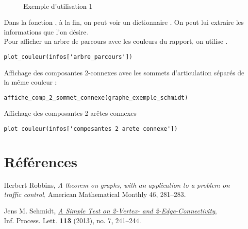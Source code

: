 \documentclass{article}      %
\begin{document}
\begin{figure}[H]
    \centering
    \\Exemple d'utilisation 1
\end{figure}

Dans la fonction , à la fin, on peut voir un dictionnaire .
On peut lui extraire les informations que l'on désire.
%
\\ Pour afficher un arbre de parcours avec les couleurs du rapport, on utilise .

\begin{lstlisting}[style=code-style]
plot_couleur(infos['arbre_parcours'])
\end{lstlisting}
\begin{figure}[H]
    \centering
\end{figure}

Affichage des composantes 2-connexes avec les sommets d'articulation séparés de la même couleur :
\begin{lstlisting}[style=code-style]
affiche_comp_2_sommet_connexe(graphe_exemple_schmidt)
\end{lstlisting}
\begin{figure}[H]
    \centering
\end{figure}

Affichage des composantes 2-arêtes-connexes
\begin{lstlisting}[style=code-style]
plot_couleur(infos['composantes_2_arete_connexe'])
\end{lstlisting}
\begin{figure}[H]
    \centering
\end{figure}


\section{Références}
\begin{thebibliography}{9}
Herbert Robbins, \textit{A theorem on graphs, with an application to a problem on traffic control}, American Mathematical Monthly 46, 281–283.

Jens M. Schmidt, \href{https://arxiv.org/ftp/arxiv/papers/1209/1209.0700.pdf}{\underline{\textit{A Simple Test on 2-Vertex- and 2-Edge-Connectivity}}},
\\Inf. Process. Lett. \textbf{113} (2013), no. 7, 241–244.
\end{thebibliography}
\end{document}
